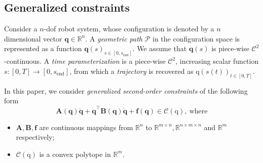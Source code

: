 \documentclass[journal]{IEEEtran}
\theoremstyle{plain}
\theoremstyle{definition}
\theoremstyle{definition}
\renewcommand{\vec}[1]{\bm{\mathrm{#1}}}  %
\newcommand{\cC}{\mathscr{C}}
\newcommand{\rmend}{\mathrm{end}}
\begin{document}
\subsection{Generalized constraints}
\label{sec:path-param-probl}

Consider a $n$-dof robot system, whose configuration is denoted by a
$n$ dimensional vector $\mathbf{q} \in \mathbb{R}^{n}$.  A
\emph{geometric path} $\mathcal{P}$ in the configuration space is
represented as a function $\mathbf{q}(s)_{s\in[0, s_\rmend]}$. We
assume that $\mathbf{q}(s)$ is piece-wise
$\mathcal{C}^{2}$-continuous. A \emph{time parameterization} is a
piece-wise $\mathcal{C}^2$, increasing scalar function
$s:[0, T] \rightarrow [0, s_\rmend]$, from which a \emph{trajectory}
is recovered as $\vec q (s(t))_{t\in[0, T]}$.

In this paper, we consider \emph{generalized second-order
  constraints} of the following form~\cite{hauser2014,pham2015time}
\begin{equation}
  \label{eq:general-form}
  \mathbf{A(q)} \ddot{\mathbf{q}} +
  \dot{\mathbf{q}}^{\top}\mathbf{B(q)}\dot{\mathbf{q}} +
  \mathbf{f(q)} \in \cC(\vec q),\ \textrm{where}
\end{equation}
\begin{itemize}
\item $\mathbf{A, B, f}$ are continuous mappings from $\mathbb{R}^n$
  to $\mathbb{R}^{m\times n},\mathbb{R}^{n\times m\times n}$ and
  $\mathbb{R}^{m}$ respectively;
\item $\cC(\vec q)$ is a convex polytope in $\mathbb{R}^{m}$.
\end{itemize}
\end{document}
